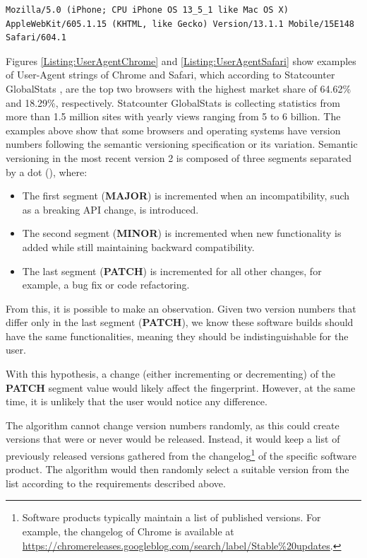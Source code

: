 \begin{lstlisting}[caption={An example of Safari User-Agent string (mobile version) \cite{MDNHeaderUserAgent}.}, label={Listing:UserAgentSafari}]
Mozilla/5.0 (iPhone; CPU iPhone OS 13_5_1 like Mac OS X) AppleWebKit/605.1.15 (KHTML, like Gecko) Version/13.1.1 Mobile/15E148 Safari/604.1
\end{lstlisting}

\medbreak

Figures \ref{Listing:UserAgentChrome} and \ref{Listing:UserAgentSafari} show examples of User-Agent strings of Chrome and Safari, which according to Statcounter GlobalStats \cite{StatcounterGlobalStats}, are the top two browsers with the highest market share of 64.62\% and 18.29\%, respectively. Statcounter GlobalStats is collecting statistics from more than 1.5 million sites with yearly views ranging from 5 to 6 billion. The examples above show that some browsers and operating systems have version numbers following the semantic versioning specification \cite{SemVerWebsite} or its variation. Semantic versioning in the most recent version 2 is composed of three segments separated by a dot (), where:

\begin{itemize}
	\item The first segment (\textbf{MAJOR}) is incremented when an incompatibility, such as a breaking API change, is introduced.
	\item The second segment (\textbf{MINOR}) is incremented when new functionality is added while still maintaining backward compatibility.
	\item The last segment (\textbf{PATCH}) is incremented for all other changes, for example, a bug fix or code refactoring.
\end{itemize}

From this, it is possible to make an observation. Given two version numbers that differ only in the last segment (\textbf{PATCH}), we know these software builds should have the same functionalities, meaning they should be indistinguishable for the user.

With this hypothesis, a change (either incrementing or decrementing) of the \textbf{PATCH} segment value would likely affect the fingerprint. However, at the same time, it is unlikely that the user would notice any difference.

The algorithm cannot change version numbers randomly, as this could create versions that were or never would be released. Instead, it would keep a list of previously released versions gathered from the changelog\footnote{Software products typically maintain a list of published versions. For example, the changelog of Chrome is available at \url{https://chromereleases.googleblog.com/search/label/Stable\%20updates}.} of the specific software product. The algorithm would then randomly select a suitable version from the list according to the requirements described above.

